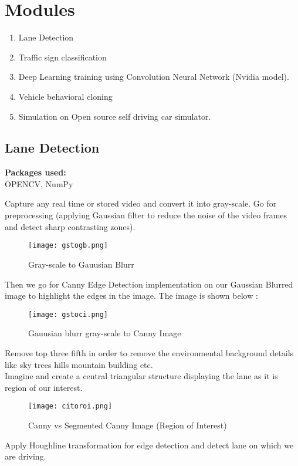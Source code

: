 \section{Modules}
\begin{enumerate}
\item Lane Detection
\item Traffic sign classification
\item Deep Learning training using  Convolution Neural Network (Nvidia model).
\item Vehicle behavioral cloning
\item Simulation on Open source self driving car simulator.
\end{enumerate}

\subsection{Lane Detection}
{\textbf{Packages used:}}\\
OPENCV, NumPy

Capture any real time or stored video and convert it into gray-scale.
Go for preprocessing (applying Gaussian filter to reduce the noise of the video frames and detect sharp contrasting zones).\\
\begin{figure}[H]
	\centering
	\texttt{[image: gstogb.png]}
	\caption{Gray-scale to Gauusian Blurr}
\end{figure}
Then we go for Canny Edge Detection implementation on our Gaussian Blurred image to highlight the edges in the image. The image is shown below :
\begin{figure}[H]
	\centering
	\texttt{[image: gstoci.png]}
	\caption{Gauusian blurr gray-scale to Canny Image}
\end{figure}
Remove top three fifth in order to remove the environmental background details like sky trees hills mountain building etc.\\
Imagine and create a central triangular structure displaying the lane as it is region of our interest.\\
\begin{figure}[H]
	\centering
	\texttt{[image: citoroi.png]}
	\caption{Canny vs Segmented Canny Image (Region of Interest)}
\end{figure}
Apply Houghline transformation for edge detection and detect lane on which we are driving.

